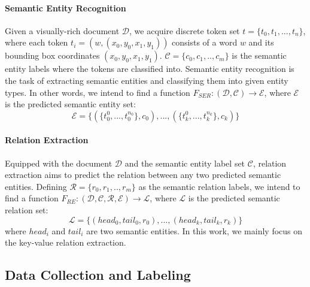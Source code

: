 \documentclass[11pt]{article}
\begin{document}
\paragraph{Semantic Entity Recognition}
Given a visually-rich document $\mathcal{D}$, we acquire discrete token set $t=\{t_0, t_1, ..., t_n\}$, where each token $t_i=(w, (x_0, y_0, x_1, y_1))$ consists of a word $w$ and its bounding box coordinates $(x_0, y_0, x_1, y_1)$. $\mathcal{C} = \{c_0, c_1, .., c_m\}$ is the semantic entity labels where the tokens are classified into.
Semantic entity recognition is the task of extracting semantic entities and classifying them into given entity types. In other words, we intend to find a function $F_{SER}:(\mathcal{D},\mathcal{C})\rightarrow \mathcal{E}$, where $\mathcal{E}$ is the predicted semantic entity set:
\begin{equation*}
	\mathcal{E} = \{
	(\{t_0^0, ..., t_0^{n_0} \}, c_0),
	...,
	(\{t_k^0, ..., t_k^{n_k}  \}, c_k)
	\}
\end{equation*}

\paragraph{Relation Extraction}
Equipped with the document $\mathcal{D}$ and the semantic entity label set $\mathcal{C}$, relation extraction aims to predict the relation between any two predicted semantic entities. Defining $\mathcal{R} = \{r_0, r_1, .., r_m\}$ as the semantic relation labels, we intend to find a function $F_{RE}:(\mathcal{D},\mathcal{C},\mathcal{R},\mathcal{E})\rightarrow \mathcal{L}$, where $\mathcal{L}$ is the predicted semantic relation set:
\begin{equation*}
	\mathcal{L} = \{
	(head_0, tail_0, r_0),
	...,
	(head_k, tail_k, r_k)
	\}
\end{equation*}
where $head_i$ and $tail_i$ are two semantic entities. In this work, we mainly focus on the key-value relation extraction.


\subsection{Data Collection and Labeling}
\end{document}
